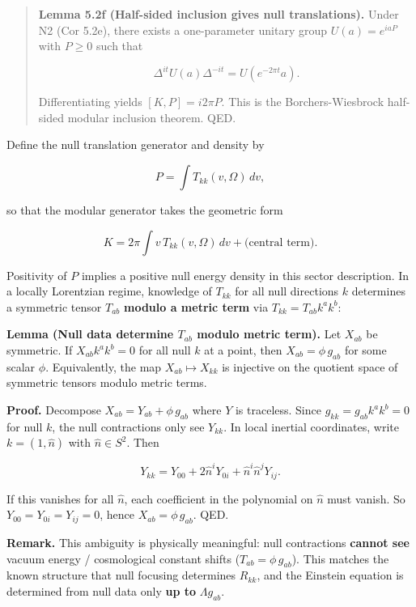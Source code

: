 \documentclass[11pt,a4paper]{article}
\theoremstyle{remark}
\begin{document}
\begin{quote}
\textbf{Lemma 5.2f (Half-sided inclusion gives null translations).} Under N2
(Cor 5.2e), there exists a one-parameter unitary group \(U(a)=e^{i a P}\) with
\(P \ge 0\) such that

\[
\Delta^{it} U(a) \Delta^{-it} = U(e^{-2\pi t} a).
\]

Differentiating yields \([K,P] = i 2\pi P\). This is the Borchers-Wiesbrock
half-sided modular inclusion theorem. QED.
\end{quote}

Define the null translation generator and density by

\[
P = \int T_{kk}(v,\Omega)\,dv,
\]

so that the modular generator takes the geometric form

\[
K = 2\pi \int v\,T_{kk}(v,\Omega)\,dv + \text{(central term)}.
\]

Positivity of \(P\) implies a positive null energy density in this sector
description. In a locally Lorentzian regime, knowledge of \(T_{kk}\) for all
null directions \(k\) determines a symmetric tensor \(T_{ab}\) \textbf{modulo a metric
term} via \(T_{kk} = T_{ab} k^a k^b\):

\textbf{Lemma (Null data determine \(T_{ab}\) modulo metric term).} Let \(X_{ab}\)
be symmetric. If \(X_{ab} k^a k^b = 0\) for all null \(k\) at a point, then
\(X_{ab} = \phi \, g_{ab}\) for some scalar \(\phi\). Equivalently, the map
\(X_{ab} \mapsto X_{kk}\) is injective on the quotient space of symmetric
tensors modulo metric terms.

\textbf{Proof.} Decompose \(X_{ab} = Y_{ab} + \phi \, g_{ab}\) where \(Y\) is
traceless. Since \(g_{kk} = g_{ab} k^a k^b = 0\) for null \(k\), the null
contractions only see \(Y_{kk}\). In local inertial coordinates, write
\(k = (1, \hat{n})\) with \(\hat{n} \in S^2\). Then

\[
Y_{kk} = Y_{00} + 2 \hat{n}^i Y_{0i} + \hat{n}^i \hat{n}^j Y_{ij}.
\]

If this vanishes for all \(\hat{n}\), each coefficient in the polynomial on
\(\hat{n}\) must vanish. So \(Y_{00} = Y_{0i} = Y_{ij} = 0\), hence
\(X_{ab} = \phi \, g_{ab}\). QED.

\textbf{Remark.} This ambiguity is physically meaningful: null contractions
\textbf{cannot see} vacuum energy / cosmological constant shifts
(\(T_{ab} = \phi \, g_{ab}\)). This matches the known structure that null
focusing determines \(R_{kk}\), and the Einstein equation is determined from
null data only \textbf{up to} \(\Lambda g_{ab}\).
\end{document}
